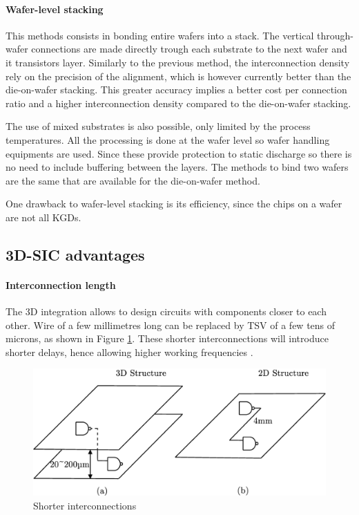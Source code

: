 \paragraph{Wafer-level stacking}

This methods consists in bonding entire wafers into a stack. The vertical through-wafer connections are made directly trough each substrate to the next wafer and it transistors layer. Similarly to the previous method, the interconnection density rely on the precision of the alignment, which is however currently better than the die-on-wafer stacking. This greater accuracy implies a better cost per connection ratio and a higher interconnection density compared to the die-on-wafer stacking.

The use of mixed substrates is also possible, only limited by the process temperatures. All the processing is done at the wafer level so wafer handling equipments are used. Since these provide protection to static discharge so there is no need to include buffering between the layers. The methods to bind two wafers are the same that are available for the die-on-wafer method.

One drawback to wafer-level stacking is its efficiency, since the chips on a wafer are not all KGDs.

\subsection{3D-SIC advantages}

\paragraph{Interconnection length}

The 3D integration allows to design circuits with components closer to each other. Wire of a few millimetres long can be replaced by TSV of a few tens of microns, as shown in Figure \ref{fig:wire}. These shorter interconnections will introduce shorter delays, hence allowing higher working frequencies \cite{659500,981091}.

\begin{figure}[h!]
\begin{center}
\includegraphics[width=0.8\linewidth]{wire.eps}
\end{center}
\vspace{-0.5cm}
\caption{Shorter interconnections \cite{659500}}
\label{fig:wire}
\end{figure}

